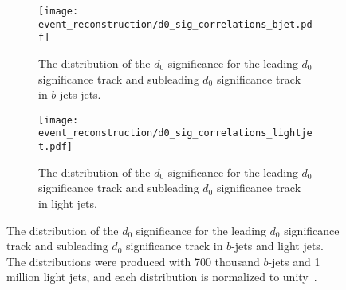 \begin{figure}[htbp]
 \centering
 \begin{subfigure}[t]{0.48\textwidth}
  \centering
  \texttt{[image: event\_reconstruction/d0\_sig\_correlations\_bjet.pdf]}
  \caption[The distribution of the $d_{0}$ significance for the leading $d_{0}$ significance track and subleading $d_{0}$ significance track in $b$-jets jets.]{%
   The distribution of the $d_{0}$ significance for the leading $d_{0}$ significance track and subleading $d_{0}$ significance track in $b$-jets jets.}
  \label{fig:d0_sig_correlations_bjet}
 \end{subfigure}%
 \quad
 \begin{subfigure}[t]{0.48\textwidth}
  \centering
  \texttt{[image: event\_reconstruction/d0\_sig\_correlations\_lightjet.pdf]}
  \caption[The distribution of the $d_{0}$ significance for the leading $d_{0}$ significance track and subleading $d_{0}$ significance track in light jets.]{%
   The distribution of the $d_{0}$ significance for the leading $d_{0}$ significance track and subleading $d_{0}$ significance track in light jets.}
  \label{fig:d0_sig_correlations_lightjet}
 \end{subfigure}%
 \caption[The distribution of the $d_{0}$ significance for the leading $d_{0}$ significance track and subleading $d_{0}$ significance track in $b$-jets and light jets.]{%
  The distribution of the $d_{0}$ significance for the leading $d_{0}$ significance track and subleading $d_{0}$ significance track in $b$-jets and light jets.
  The distributions were produced with 700 thousand $b$-jets and 1 million light jets, and each distribution is normalized to unity~\cite{ATL-PHYS-PUB-2017-003}.}
 \label{fig:RNNIP_track_significance}
\end{figure}

